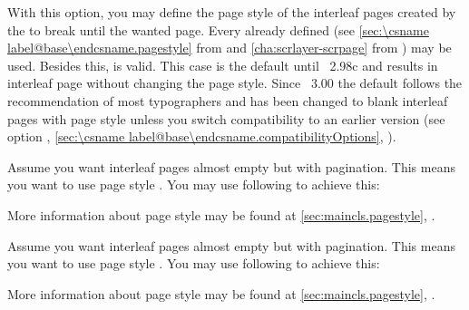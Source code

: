 \begin{Declaration}
\end{Declaration}%
With this option, you may define the page style of the
interleaf pages created by the  to break until the
wanted page. Every already defined  (see
\autoref{sec:\csname label@base\endcsname.pagestyle} from
 and
\autoref{cha:scrlayer-scrpage} from ) may be
used. Besides this,  is valid. This case
is the default until \KOMAScript~2.98c and results in interleaf page without
changing the page style. Since
\KOMAScript~3.00 the default follows the
recommendation of most typographers and has been changed to blank interleaf
pages with page style  unless you switch compatibility to an
earlier version (see option , \autoref{sec:\csname
  label@base\endcsname.compatibilityOptions}, ).  \ifCommonmaincls
\begin{Example}
  \label{desc:maincls.option.cleardoublepage.example}
  Assume you want interleaf pages almost empty but with pagination. This
  means you want to use page style . You may use following to
  achieve this:
\begin{lstcode}
\end{lstcode}
  More information about page style  may be found at
  \autoref{sec:maincls.pagestyle}, .
\end{Example}
\fi
\ifCommonscrextend
\begin{Example}
  \label{desc:scrextend.option.cleardoublepage.example}
  Assume you want interleaf pages almost empty but with pagination. This
  means you want to use page style . You may use following to
  achieve this:
\begin{lstcode}
\end{lstcode}
  More information about page style  may be found at
  \autoref{sec:maincls.pagestyle}, .
\end{Example}
\fi
\EndIndexGroup


